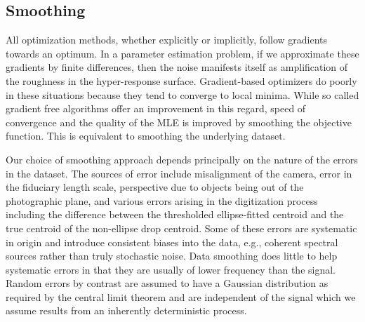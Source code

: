 \documentclass[12pt,a4paper,oneside]{book}
\begin{document}
\subsection{Smoothing}
All optimization methods, whether explicitly or implicitly, follow gradients towards an optimum. In a parameter estimation problem, if we approximate these gradients by finite differences, then the noise manifests itself as amplification of the roughness in the hyper-response surface. Gradient-based optimizers do poorly in these situations because they tend to converge to local minima. While so called gradient free algorithms offer an improvement in this regard, speed of convergence and the quality of the MLE is improved by smoothing the objective function. This is equivalent to smoothing the underlying dataset.

Our choice of smoothing approach depends principally on the nature of the errors in the dataset. The sources of error include misalignment of the camera, error in the fiduciary length scale, perspective due to objects being out of the photographic plane, and various errors arising in the digitization process including the difference between the thresholded ellipse-fitted centroid and the true centroid of the non-ellipse drop centroid. Some of these errors are systematic in origin and introduce consistent biases into the data, e.g., coherent spectral sources rather than truly stochastic noise. Data smoothing does little to help systematic errors in that they are usually of lower frequency than the signal. Random errors by contrast are assumed to have a Gaussian distribution as required by the central limit theorem and are independent of the signal which we assume results from an inherently deterministic process.
\end{document}
